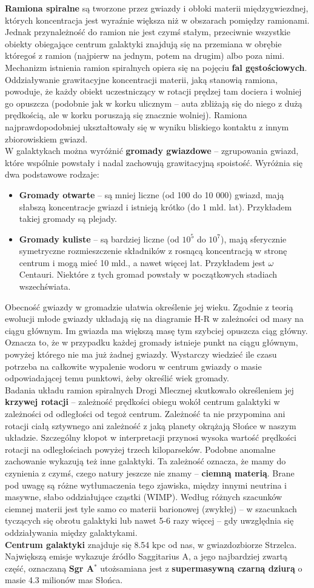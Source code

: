 \documentclass[../index.tex]{subfiles}
\begin{document}
        \textbf{Ramiona spiralne} są tworzone przez gwiazdy i obłoki materii międzygwiezdnej, których koncentracja jest wyraźnie większa niż w obszarach pomiędzy ramionami. Jednak przynależność do ramion nie jest czymś stałym, przeciwnie wszystkie obiekty obiegające centrum galaktyki znajdują się na przemiana w obrębie któregoś z ramion (najpierw na jednym, potem na drugim) albo poza nimi. Mechanizm istnienia ramion spiralnych opiera się na pojęciu \textbf{fal gęstościowych}. Oddziaływanie grawitacyjne koncentracji materii, jaką stanowią ramiona, powoduje, że każdy obiekt uczestniczący w rotacji prędzej tam dociera i wolniej go opuszcza (podobnie jak w korku ulicznym – auta zbliżają się do niego z dużą prędkością, ale w korku poruszają się znacznie wolniej). Ramiona najprawdopodobniej ukształtowały się w wyniku bliskiego kontaktu z innym zbiorowiskiem gwiazd.\\
        W galaktykach można wyróżnić \textbf{gromady gwiazdowe} – zgrupowania gwiazd, które wspólnie powstały i nadal zachowują grawitacyjną spoistość. Wyróżnia się dwa podstawowe rodzaje:
        \begin{itemize}
            \item \textbf{Gromady otwarte} – są mniej liczne (od 100 do 10 000) gwiazd, mają słabszą koncentracje gwiazd i istnieją krótko (do 1 mld. lat). Przykładem takiej gromady są plejady.
            \item \textbf{Gromady kuliste} – są bardziej liczne (od \(10^{5}\) do \(10^{7}\)), mają sferycznie symetryczne rozmieszczenie składników z rosnącą koncentracją w stronę centrum i mogą mieć 10 mld., a nawet więcej lat. Przykładem jest \(\omega\) Centauri. Niektóre z tych gromad powstały w początkowych stadiach wszechświata.
        \end{itemize}
        Obecność gwiazdy w gromadzie ułatwia określenie jej wieku. Zgodnie z teorią ewolucji młode gwiazdy układają się na diagramie H-R w zależności od masy na ciągu głównym. Im gwiazda ma większą masę tym szybciej opuszcza ciąg główny. Oznacza to, że w przypadku każdej gromady istnieje punkt na ciągu głównym, powyżej którego nie ma już żadnej gwiazdy. Wystarczy wiedzieć ile czasu potrzeba na całkowite wypalenie wodoru w centrum gwiazdy o masie odpowiadającej temu punktowi, żeby określić wiek gromady.\\
        Badania układu ramion spiralnych Drogi Mlecznej skutkowało określeniem jej \textbf{krzywej rotacji} – zależność prędkości obiegu wokół centrum galaktyki w zależności od odległości od tegoż centrum. Zależność ta nie przypomina ani rotacji ciałą sztywnego ani zależność z jaką planety okrążają Słońce w naszym układzie. Szczególny kłopot w interpretacji przynosi wysoka wartość prędkości rotacji na odległościach powyżej trzech kiloparseków. Podobne anomalne zachowanie wykazują też inne galaktyki. Ta zależność oznacza, że mamy do czynienia z czymś, czego natury jeszcze nie znamy – \textbf{ciemną materią}. Brane pod uwagę są różne wytłumaczenia tego zjawiska, między innymi neutrina i masywne, słabo oddziałujące cząstki (WIMP). Według różnych szacunków ciemnej materii jest tyle samo co materii barionowej (zwykłej) – w szacunkach tyczących się obrotu galaktyki lub nawet 5-6 razy więcej – gdy uwzględnia się oddziaływania między galaktykami.\\
        \textbf{Centrum galaktyki} znajduje się 8.54 kpc od nas, w gwiazdozbiorze Strzelca. Największą emisje wykazuje źródło Saggitarius A, a jego najbardziej zwartą część, oznaczaną \textbf{Sgr A\(^{*}\)} utożsamiana jest z \textbf{supermasywną czarną dziurą} o masie 4.3 milionów mas Słońca.
\end{document}
